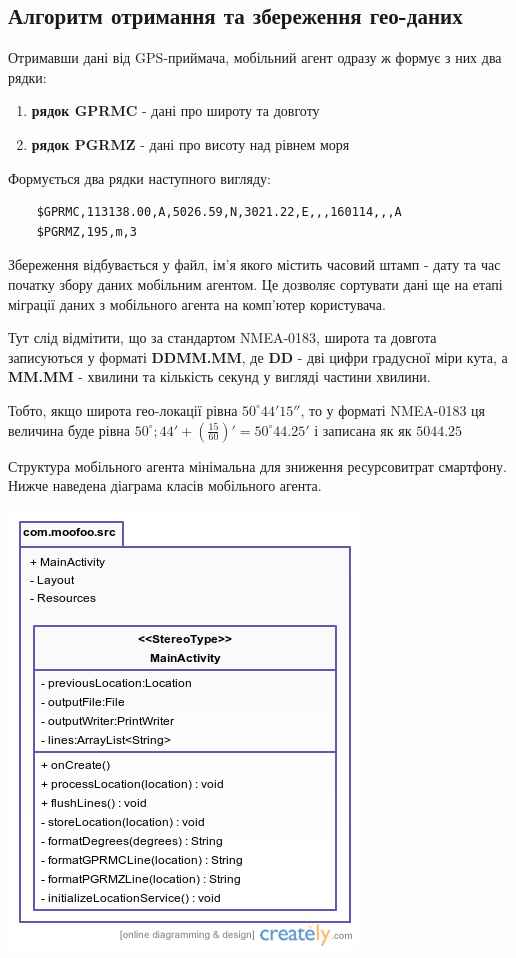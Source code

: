 \documentclass[simple,a4paper,14pt,ukrainian,utf8]{eskdtext}
\begin{document}
    \subsection{Алгоритм отримання та збереження гео-даних}
    
    Отримавши дані від GPS-приймача, мобільний агент одразу ж формує з них два рядки:
    
    \begin{enumerate}
    	\item \textbf{рядок GPRMC} - дані про широту та довготу
    	\item \textbf{рядок PGRMZ} - дані про висоту над рівнем моря
    \end{enumerate}
    
	Формується два рядки наступного вигляду:
	
	\begin{lstlisting}
	$GPRMC,113138.00,A,5026.59,N,3021.22,E,,,160114,,,A
	$PGRMZ,195,m,3
	\end{lstlisting}
    
    Збереження відбувається у файл, ім’я якого містить часовий штамп - дату та час початку збору даних мобільним агентом. Це дозволяє сортувати дані ще на етапі міграції даних з мобільного агента на комп’ютер користувача.
    
    Тут слід відмітити, що за стандартом NMEA-0183, широта та довгота записуються у форматі \textbf{DDMM.MM}, де \textbf{DD} - дві цифри градусної міри кута, а \textbf{MM.MM} - хвилини та кількість секунд у вигляді частини хвилини.
    
    Тобто, якщо широта гео-локації рівна $50^\circ 44' 15''$, то у форматі NMEA-0183 ця величина буде рівна $50^\circ; 44' + (\frac{15}{60})' = 50^\circ 44.25'$ і записана як як $5044.25$
    
    Структура мобільного агента мінімальна для зниження ресурсовитрат смартфону. Нижче наведена діаграма класів мобільного агента.
    
    \vspace{3em}
    \includegraphics[scale=0.75]{images/mobile_agent_classes.png}
\end{document}
